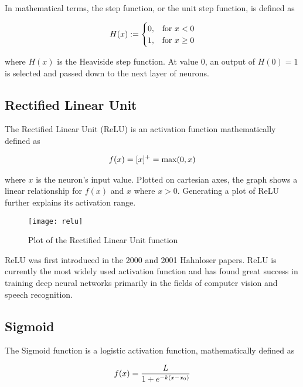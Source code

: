 In mathematical terms, the step function, or the unit step function, is defined as

\begin{align}
    \centering
    H(x) := \begin{cases}
        0, & \text{for } x < 0 \\
        1, & \text{for } x \geq 0
    \end{cases}
\end{align}

where $H(x)$ is the Heaviside step function. At value 0, an output of $H(0) = 1$ is selected and passed down to the next layer of neurons.

\subsection{Rectified Linear Unit}
The Rectified Linear Unit (ReLU) is an activation function mathematically defined as 

\begin{align}
    \centering
    f(x) = [x]^+ = \text{max}(0, x) 
\end{align}

where $x$ is the neuron's input value. Plotted on cartesian axes, the graph shows a linear relationship for $f(x)$ and $x$ where $x > 0$. Generating a plot of ReLU further explains its activation range.

\begin{figure}[H]
    \centering
    \texttt{[image: relu]}
    \caption{Plot of the Rectified Linear Unit function}
    \label{tab:relu}
\end{figure}

ReLU was first introduced in the 2000 and 2001 Hahnloser papers. ReLU is currently the most widely used activation function and has found great success in training deep neural networks primarily in the fields of computer vision and speech recognition.

\subsection{Sigmoid}
The Sigmoid function is a logistic activation function, mathematically defined as 

\begin{align}
    \centering
    f(x) = \frac{L}{1 + e^{-k(x-x_0)}}
\end{align}


